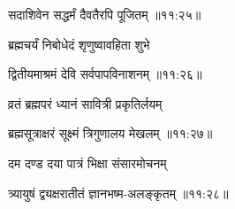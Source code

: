 
{\devanagarifont सदाशिवेन सद्धर्मं दैवतैरपि पूजितम् {॥११:२५॥} \veg\dontdisplaylinenum }%


 
{\devanagarifont ब्रह्मचर्यं निबोधेदं शृणुष्वावहिता शुभे \thinspace{\dandab} \dontdisplaylinenum }%


{\devanagarifont द्वितीयमाश्रमं देवि सर्वपापविनाशनम् {॥११:२६॥} \veg\dontdisplaylinenum }%

{\devanagarifont व्रतं ब्रह्मपरं ध्यानं सावित्री प्रकृतिर्लयम् \thinspace{\dandab} \dontdisplaylinenum }%


{\devanagarifont ब्रह्मसूत्राक्षरं सूक्ष्मं त्रिगुणालय मेखलम् {॥११:२७॥} \veg\dontdisplaylinenum }%

{\devanagarifont दम दण्ड दया पात्रं भिक्षा संसारमोचनम् \thinspace{\dandab} \dontdisplaylinenum }%


{\devanagarifont त्र्यायुषं द्व्यक्षरातीतं ज्ञानभष्म-अलङ्कृतम् {॥११:२८॥} \veg\dontdisplaylinenum }%

